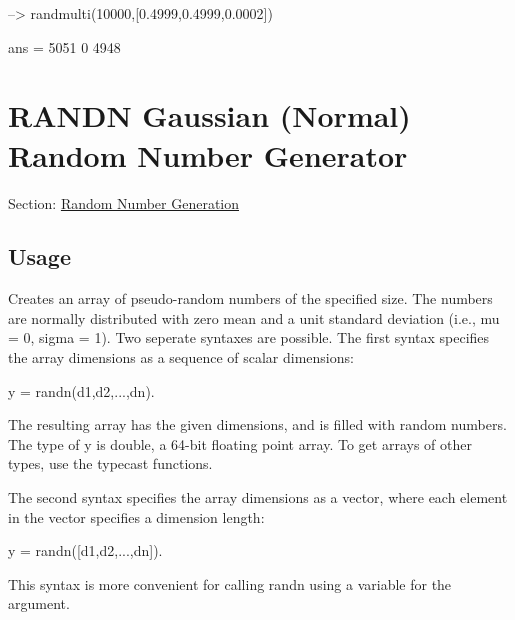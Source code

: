\begin{DoxyVerbInclude}
--> randmulti(10000,[0.4999,0.4999,0.0002])

ans = 
 5051    0 4948 
\end{DoxyVerbInclude}
 \hypertarget{random_randn}{}\section{R\-A\-N\-D\-N Gaussian (Normal) Random Number Generator}\label{random_randn}
Section\-: \hyperlink{sec_random}{Random Number Generation} \hypertarget{vtkwidgets_vtkxyplotwidget_Usage}{}\subsection{Usage}\label{vtkwidgets_vtkxyplotwidget_Usage}
Creates an array of pseudo-\/random numbers of the specified size. The numbers are normally distributed with zero mean and a unit standard deviation (i.\-e., {\ttfamily mu = 0, sigma = 1}). Two seperate syntaxes are possible. The first syntax specifies the array dimensions as a sequence of scalar dimensions\-: \begin{DoxyVerb}  y = randn(d1,d2,...,dn).
\end{DoxyVerb}
 The resulting array has the given dimensions, and is filled with random numbers. The type of {\ttfamily y} is {\ttfamily double}, a 64-\/bit floating point array. To get arrays of other types, use the typecast functions.

The second syntax specifies the array dimensions as a vector, where each element in the vector specifies a dimension length\-: \begin{DoxyVerb}  y = randn([d1,d2,...,dn]).
\end{DoxyVerb}
 This syntax is more convenient for calling {\ttfamily randn} using a variable for the argument.

